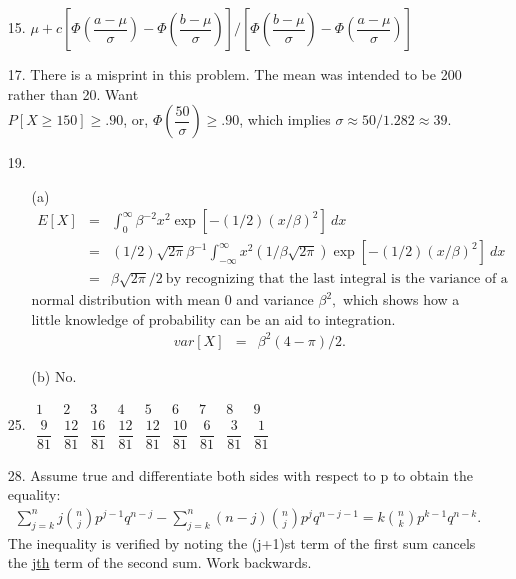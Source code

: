 \begin{enumerate}
	\item[15.] $\mu + c\left[\Phi\left(\dfrac{a-\mu}{\sigma}\right) - \Phi\left(\dfrac{b-\mu}{\sigma}\right)\right]/\left[\Phi\left(\dfrac{b-\mu}{\sigma}\right) - \Phi\left(\dfrac{a-\mu}{\sigma}\right)\right]$
	
	\item[17.] There is a misprint in this problem.  The mean was intended to be 200 rather than 20.  Want \\
	$P[X \ge 150] \ge .90$, or, $\Phi\left(\dfrac{50}{\sigma}\right) \ge .90$, which implies $\sigma \approx 50/1.282 \approx 39$.
	
	\item[19.] \begin{enumerate}
		\item[(a)] \begin{eqnarray*}
			E[X] &=& \int_{0}^{\infty} \beta^{-2}x^2\exp[-(1/2)(x/\beta)^2]\ dx \\
			&=& (1/2)\sqrt{2\pi}\beta^{-1}\int_{-\infty}^{\infty}x^2(1/\beta\sqrt{2\pi})\exp[-(1/2)(x/\beta)^2]\ dx \\
			&=& \beta\sqrt{2\pi}/2\ \text{by recognizing that the last integral is the variance of a} 
		\end{eqnarray*} 
		normal distribution with mean $0$ and variance $\beta^2,$ which shows how a little knowledge of probability can be an aid to integration.
		\begin{eqnarray*}
		var[X] &=& \beta^2(4-\pi)/2.
		\end{eqnarray*}
	
		\item[(b)] No.	
	\end{enumerate}

	\item[25.] $\begin{array}{c|c|c|c|c|c|c|c|c}
		1 & 2 & 3 & 4 & 5 & 6 & 7 & 8 & 9 \\ \hline
		\dfrac{9}{81} & \dfrac{12}{81} & \dfrac{16}{81}& \dfrac{12}{81}& \dfrac{12}{81} & \dfrac{10}{81}& \dfrac{6}{81}& \dfrac{3}{81}& \dfrac{1}{81}
	\end{array}$
	
	\item[28.] Assume true and differentiate both sides with respect to p to obtain the equality:
	\begin{eqnarray*}
	\sum_{j=k}^{n} j{n\choose j}p^{j-1}q^{n-j} - \sum_{j=k}^{n}(n-j){n\choose j}p^jq^{n-j-1} = k{n\choose k}p^{k-1}q^{n-k}.
	\end{eqnarray*} 
	The inequality is verified by noting the (j+1)st term of the first sum cancels the j\underline{th} term of the second sum.  Work backwards.
	

\end{enumerate}
